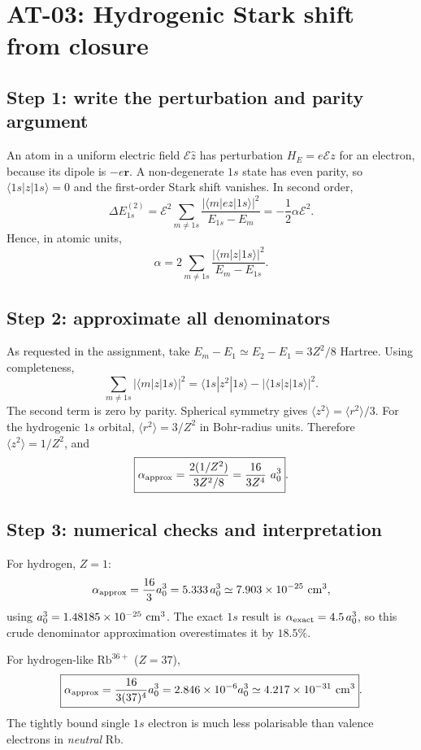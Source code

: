 
\section{AT-03: Hydrogenic Stark shift from closure}
\subsection*{Step 1: write the perturbation and parity argument}
An atom in a uniform electric field \(\mathcal E\hat z\)
has perturbation \(H_E=e\mathcal E z\) for an electron,
because its dipole is \(-e\mathbf r\).
A non-degenerate \(1s\) state has even parity, so
\(\langle1s|z|1s\rangle=0\) and the first-order Stark
shift vanishes. In second order,
\[
\Delta E_{1s}^{(2)}=
\mathcal E^2\sum_{m\ne1s}
\frac{|\langle m|ez|1s\rangle|^2}{E_{1s}-E_m}
=-\frac12\alpha\mathcal E^2.
\]
Hence, in atomic units,
\[
\boxed{\alpha=2\sum_{m\ne1s}
\frac{|\langle m|z|1s\rangle|^2}{E_m-E_{1s}}}.
\]

\subsection*{Step 2: approximate all denominators}
As requested in the assignment, take
\(E_m-E_1\simeq E_2-E_1=3Z^2/8\) Hartree.
Using completeness,
\[
\sum_{m\ne1s}|\langle m|z|1s\rangle|^2
=\langle1s|z^2|1s\rangle
-|\langle1s|z|1s\rangle|^2 .
\]
The second term is zero by parity. Spherical symmetry
gives \(\langle z^2\rangle=\langle r^2\rangle/3\).
For the hydrogenic \(1s\) orbital,
\(\langle r^2\rangle=3/Z^2\) in Bohr-radius units.
Therefore \(\langle z^2\rangle=1/Z^2\), and
\[
\boxed{\alpha_{\rm approx}
=\frac{2(1/Z^2)}{3Z^2/8}
=\frac{16}{3Z^4}\ a_0^3}.
\]

\subsection*{Step 3: numerical checks and interpretation}
For hydrogen, \(Z=1\):
\[
\alpha_{\rm approx}=\frac{16}{3}a_0^3
=5.333\,a_0^3\simeq7.903\times10^{-25}\ {\rm cm}^3,
\]
using \(a_0^3=1.48185\times10^{-25}\ {\rm cm}^3\).
The exact \(1s\) result is
\(\alpha_{\rm exact}=4.5\,a_0^3\), so this crude
denominator approximation overestimates it by \(18.5\%\).

For hydrogen-like \(\mathrm{Rb}^{36+}\) (\(Z=37\)),
\[
\boxed{\alpha_{\rm approx}=
\frac{16}{3(37)^4}a_0^3
=2.846\times10^{-6}a_0^3
\simeq4.217\times10^{-31}\ {\rm cm}^3}.
\]
The tightly bound single \(1s\) electron is much less
polarisable than valence electrons in \emph{neutral} Rb.

